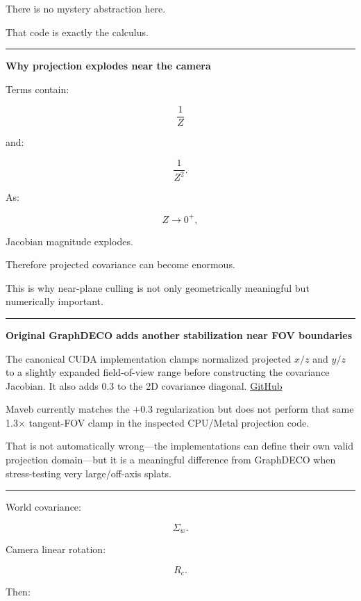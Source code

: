 There is no mystery abstraction here.

That code is exactly the calculus.

\begin{center}\rule{0.5\linewidth}{0.5pt}\end{center}

\textbf{Why projection explodes near the camera}

Terms contain:

\[
\frac1Z
\]

and:

\[
\frac1{Z^2}.
\]

As:

\[
Z\rightarrow0^+,
\]

Jacobian magnitude explodes.

Therefore projected covariance can become enormous.

This is why near-plane culling is not only geometrically meaningful but numerically important.

\begin{center}\rule{0.5\linewidth}{0.5pt}\end{center}

\textbf{Original GraphDECO adds another stabilization near FOV boundaries}

The canonical CUDA implementation clamps normalized projected \(x/z\) and \(y/z\) to a slightly expanded field-of-view range before constructing the covariance Jacobian. It also adds \(0.3\) to the 2D covariance diagonal. \href{https://github.com/graphdeco-inria/diff-gaussian-rasterization/blob/main/cuda_rasterizer/forward.cu?utm_source=chatgpt.com}{GitHub}

Maveb currently matches the \(+0.3\) regularization but does not perform that same 1.3× tangent-FOV clamp in the inspected CPU/Metal projection code.

That is not automatically wrong---the implementations can define their own valid projection domain---but it is a meaningful difference from GraphDECO when stress-testing very large/off-axis splats.

\begin{center}\rule{0.5\linewidth}{0.5pt}\end{center}

World covariance:

\[
\Sigma_w.
\]

Camera linear rotation:

\[
R_c.
\]

Then:


